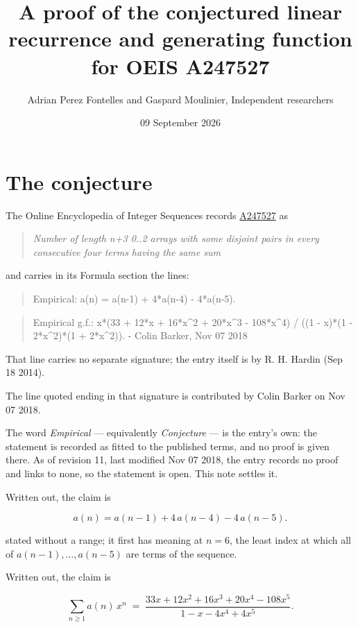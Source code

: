 \documentclass[11pt]{article}
\title{A proof of the conjectured linear recurrence and generating function for OEIS A247527}
\author{Adrian Perez Fontelles and Gaspard Moulinier, Independent researchers}
\date{09 September 2026}
\theoremstyle{definition}
\begin{document}
\maketitle
\section{The conjecture}

The Online Encyclopedia of Integer Sequences records \href{https://oeis.org/A247527}{A247527} as

\begin{quote}\itshape Number of length n+3 0..2 arrays with some disjoint pairs in every consecutive four terms having the same sum\end{quote}

and carries in its Formula section the lines:

\begin{quote}\ttfamily Empirical: a(n) = a(n-1) + 4*a(n-4) - 4*a(n-5).\end{quote}

\begin{quote}\ttfamily Empirical g.f.: x*(33 + 12*x + 16*x\textasciicircum{}2 + 20*x\textasciicircum{}3 - 108*x\textasciicircum{}4) / ((1 - x)*(1 - 2*x\textasciicircum{}2)*(1 + 2*x\textasciicircum{}2)). - Colin Barker, Nov 07 2018\end{quote}

That line carries no separate signature; the entry itself is by R. H. Hardin (Sep 18 2014).

The line quoted ending in that signature is contributed by Colin Barker on Nov 07 2018.

The word {\itshape Empirical} --- equivalently {\itshape Conjecture} --- is the entry's own: the statement is recorded as fitted to the published terms, and no proof is given there. As of revision 11, last modified Nov 07 2018, the entry records no proof and links to none, so the statement is open. This note settles it.

Written out, the claim is

\[a(n) = a(n-1) + 4\,a(n-4) - 4\,a(n-5).\]

stated without a range; it first has meaning at $n = 6$, the least index at which all of $a(n-1),\dots,a(n-5)$ are terms of the sequence.

Written out, the claim is

\[\sum_{n \ge 1} a(n)\,x^n \;=\; \frac{33x + 12x^{2} + 16x^{3} + 20x^{4} - 108x^{5}}{1 - x - 4x^{4} + 4x^{5}}.\]
\end{document}
